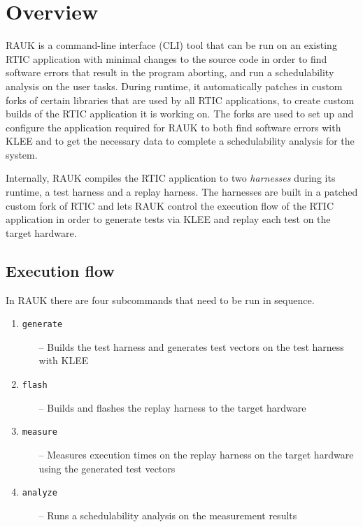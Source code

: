 \section{Overview}
RAUK is a command-line interface (CLI) tool that can be run on an existing
RTIC application with minimal changes to the source code in order to find software
errors that result in the program aborting, and run a
schedulability analysis on the user tasks. During runtime, it automatically
patches in custom forks of certain libraries that are used by all RTIC
applications, to create custom builds of the RTIC application it is working on.
The forks are used to set up and configure the application required for RAUK to both
find software errors with KLEE and to get the necessary data to complete a
schedulability analysis for the system.

Internally, RAUK compiles the RTIC application to two \emph{harnesses} during
its runtime, a test harness and a replay harness. The harnesses are built in a
patched custom fork of RTIC and lets RAUK control the execution flow of the
RTIC application in order to generate tests via KLEE and replay each test on
the target hardware.

\subsection{Execution flow}
In RAUK there are four subcommands that need to be run in sequence.

\begin{enumerate}
    \item \texttt{generate}
    \begin{itemize}
        \item [--] Builds the test harness and generates test vectors on the test
            harness with KLEE
    \end{itemize}
    \item \texttt{flash}
    \begin{itemize}
        \item [--] Builds and flashes the replay harness to the target hardware
    \end{itemize}
    \item \texttt{measure}
    \begin{itemize}
        \item [--] Measures execution times on the replay harness on the target
            hardware using the generated test vectors
    \end{itemize}
    \item \texttt{analyze}
    \begin{itemize}
        \item [--] Runs a schedulability analysis on the measurement results
    \end{itemize}
\end{enumerate}

